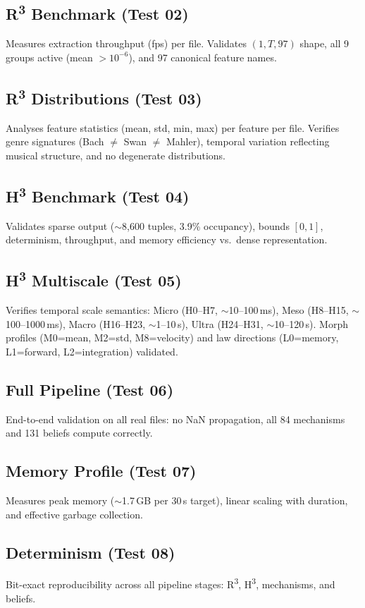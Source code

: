 \documentclass[10pt,twocolumn]{article}
\newcommand{\Rthree}{R\textsuperscript{3}}
\newcommand{\Hthree}{H\textsuperscript{3}}
\begin{document}
\subsection{\Rthree{} Benchmark (Test 02)}
Measures extraction throughput (fps) per file. Validates $(1,T,97)$ shape, all 9 groups active (mean $> 10^{-6}$), and 97 canonical feature names.

\subsection{\Rthree{} Distributions (Test 03)}
Analyses feature statistics (mean, std, min, max) per feature per file. Verifies genre signatures (Bach $\neq$ Swan $\neq$ Mahler), temporal variation reflecting musical structure, and no degenerate distributions.

\subsection{\Hthree{} Benchmark (Test 04)}
Validates sparse output ($\sim$8,600 tuples, 3.9\% occupancy), bounds $[0,1]$, determinism, throughput, and memory efficiency vs.\ dense representation.

\subsection{\Hthree{} Multiscale (Test 05)}
Verifies temporal scale semantics: Micro (H0--H7, $\sim$10--100\,ms), Meso (H8--H15, $\sim$100--1000\,ms), Macro (H16--H23, $\sim$1--10\,s), Ultra (H24--H31, $\sim$10--120\,s). Morph profiles (M0=mean, M2=std, M8=velocity) and law directions (L0=memory, L1=forward, L2=integration) validated.

\subsection{Full Pipeline (Test 06)}
End-to-end validation on all real files: no NaN propagation, all 84 mechanisms and 131 beliefs compute correctly.

\subsection{Memory Profile (Test 07)}
Measures peak memory ($\sim$1.7\,GB per 30\,s target), linear scaling with duration, and effective garbage collection.

\subsection{Determinism (Test 08)}
Bit-exact reproducibility across all pipeline stages: \Rthree{}, \Hthree{}, mechanisms, and beliefs.
\end{document}
